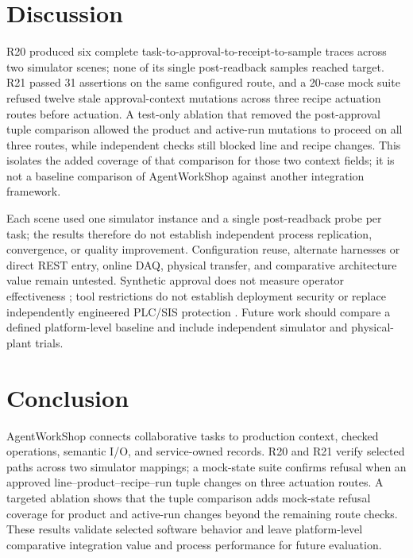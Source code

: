 \section{Discussion}
\label{sec:limits}
R20 produced six complete task-to-approval-to-receipt-to-sample traces across
two simulator scenes; none of its single post-readback samples reached target.
R21 passed 31 assertions on the same configured route, and a 20-case mock
suite refused twelve stale approval-context mutations across three recipe
actuation routes before actuation. A test-only ablation that removed the
post-approval tuple comparison allowed the product and active-run mutations
to proceed on all three routes, while independent checks still blocked line
and recipe changes. This isolates the added coverage of that comparison for
those two context fields; it is not a baseline comparison of AgentWorkShop
against another integration framework.

Each scene used one simulator instance and a single post-readback probe per
task; the results therefore do not establish independent process replication,
convergence, or quality improvement. Configuration reuse, alternate harnesses
or direct REST entry, online DAQ, physical transfer, and comparative
architecture value remain untested. Synthetic approval does not measure
operator effectiveness
\cite{parasuramanmanzey2010complacency,parasuraman2000model,bainbridge1983ironies};
tool restrictions do not establish deployment security
\cite{greshake2023injection,liu2024pinjection,iec62443-3-3} or replace
independently engineered PLC/SIS protection \cite{iec61511}. Future work
should compare a defined platform-level baseline and include independent
simulator and physical-plant trials.

\section{Conclusion}
\label{sec:conclusion}
AgentWorkShop connects collaborative tasks to production context, checked
operations, semantic I/O, and service-owned records. R20 and R21 verify
selected paths across two simulator mappings; a mock-state suite confirms
refusal when an approved line--product--recipe--run tuple changes on three
actuation routes. A targeted ablation shows that the tuple comparison adds
mock-state refusal coverage for product and active-run changes beyond the
remaining route checks. These results validate selected software behavior and
leave platform-level comparative integration value and process performance
for future evaluation.
